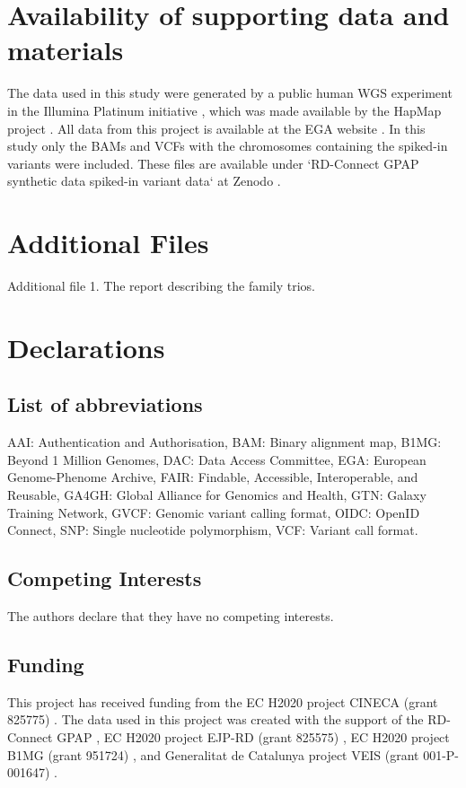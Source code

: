 \section*{Availability of supporting data and materials}
The data used in this study were generated by a public human WGS experiment in the Illumina Platinum initiative \cite{Eberle}, which was made available by the HapMap project \cite{HapMap}. All data from this project is available at the EGA website \cite{EGA}. In this study only the BAMs and VCFs with the chromosomes containing the spiked-in variants were included. These files are available under `RD-Connect GPAP synthetic data spiked-in variant data` at Zenodo \cite{zenodo}. 

\section*{Additional Files}
Additional file 1. The report describing the family trios.

\section*{Declarations}

\subsection*{List of abbreviations}
AAI: Authentication and Authorisation, BAM: Binary alignment map, B1MG: Beyond 1 Million Genomes, DAC: Data Access Committee, EGA: European Genome-Phenome Archive, FAIR: Findable, Accessible, Interoperable, and Reusable, GA4GH: Global Alliance for Genomics and Health, GTN: Galaxy Training Network, GVCF: Genomic variant calling format, OIDC: OpenID Connect, SNP: Single nucleotide polymorphism, VCF: Variant call format.

\subsection*{Competing Interests}
The authors declare that they have no competing interests.

\subsection*{Funding}
This project has received funding from the EC H2020 project CINECA (grant 825775) \cite{CINECA}. The data used in this project was created with the support of the RD-Connect GPAP \cite{RD_connect_GPAP}, EC H2020 project EJP-RD (grant 825575) \cite{EJP-RD}, EC H2020 project B1MG (grant 951724) \cite{B1MG_grant}, and Generalitat de Catalunya project VEIS (grant 001-P-001647) \cite{VEIS}.

